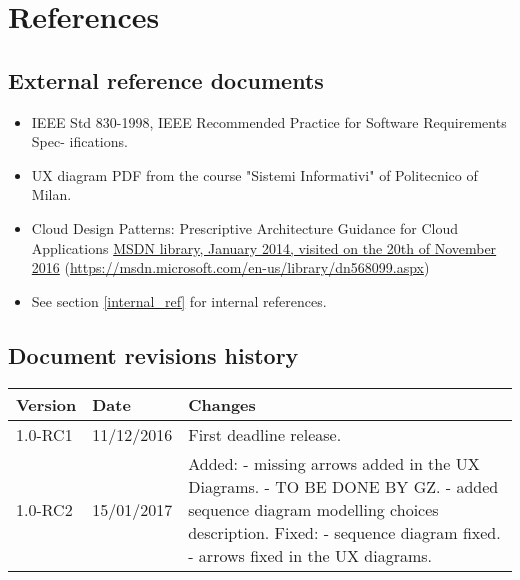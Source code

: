 \section{References}

\subsection{External reference documents}
\label{external_ref}
\begin{itemize}
    \item IEEE Std 830-1998, IEEE Recommended Practice for Software Requirements Spec- ifications.
    \item UX diagram PDF from the course "Sistemi Informativi" of Politecnico of Milan.
    \item Cloud Design Patterns: Prescriptive Architecture Guidance for Cloud Applications \href{https://msdn.microsoft.com/en-us/library/dn568099.aspx}{MSDN library, January 2014, visited on the 20th of November 2016} (\url{https://msdn.microsoft.com/en-us/library/dn568099.aspx})
    \item See section \ref{internal_ref} for internal references.
\end{itemize}



\subsection{Document revisions history}
\begin{tabular}{| l | l | p{10cm} |}
\hline
\textbf{Version} & \textbf{Date} & \textbf{Changes}\\
\hline
1.0-RC1 & 11/12/2016 & First deadline release.\\
\hline
1.0-RC2 & 15/01/2017 & Added:\newline
    - missing arrows added in the UX Diagrams.\newline
    - TO BE DONE BY GZ.\newline
    - added sequence diagram modelling choices description.\newline
    Fixed:\newline
    - sequence diagram fixed.\newline
    - arrows fixed in the UX diagrams.\\
\hline
\end{tabular} 
